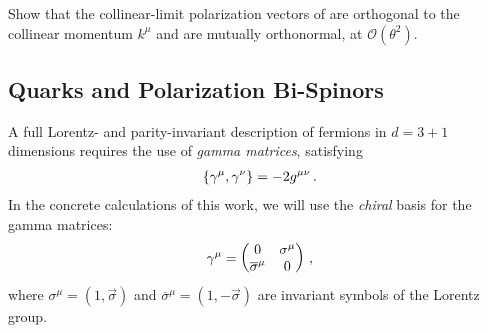 \begin{subappendices}
\begin{exercise}
    Show that the collinear-limit polarization vectors of  are orthogonal to the collinear momentum \(k^\mu\) and are mutually orthonormal, at \(\mathcal{O}(\theta^2)\).
\end{exercise}




\subsection{Quarks and Polarization Bi-Spinors}

A full Lorentz- and parity-invariant description of fermions in \(d = 3+1\) dimensions requires the use of \textit{gamma matrices}, satisfying
\begin{align}
    \acomm{\gamma^\mu}{\gamma^\nu} = -2 g^{\mu\nu}
    \,.
\end{align}
%
In the concrete calculations of this work, we will use the \textit{chiral} basis for the gamma matrices:
\begin{align}
    \gamma^\mu = \begin{pmatrix}0 & \sigma^\mu\\\overline{\sigma}^\mu & 0\end{pmatrix}
    \,,
\end{align}
where \(\sigma^\mu = (1, \vec{\sigma})\) and \(\overline{\sigma}^\mu = (1, -\vec{\sigma})\) are invariant symbols of the Lorentz group.



\end{subappendices}
